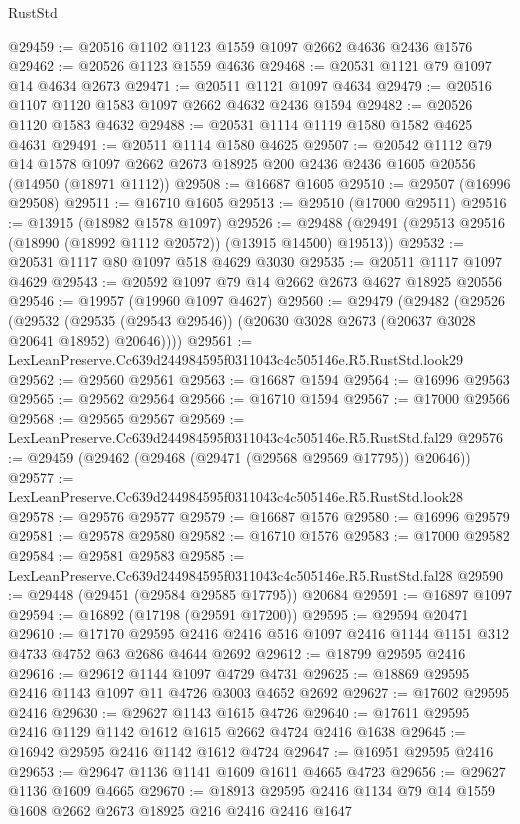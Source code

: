 \begin{lexlean}{RustStd}
\begin{coremodule}
@29459 := @20516 @1102 @1123 @1559 @1097 @2662 @4636 @2436 @1576
@29462 := @20526 @1123 @1559 @4636
@29468 := @20531 @1121 @79 @1097 @14 @4634 @2673
@29471 := @20511 @1121 @1097 @4634
@29479 := @20516 @1107 @1120 @1583 @1097 @2662 @4632 @2436 @1594
@29482 := @20526 @1120 @1583 @4632
@29488 := @20531 @1114 @1119 @1580 @1582 @4625 @4631
@29491 := @20511 @1114 @1580 @4625
@29507 := @20542
    @1112
    @79
    @14
    @1578
    @1097
    @2662
    @2673
    @18925
    @200
    @2436
    @2436
    @1605
    @20556
    (@14950 (@18971 @1112))
@29508 := @16687 @1605
@29510 := @29507 (@16996 @29508)
@29511 := @16710 @1605
@29513 := @29510 (@17000 @29511)
@29516 := @13915 (@18982 @1578 @1097)
@29526 := @29488 (@29491 (@29513 @29516 (@18990 (@18992 @1112 @20572)) (@13915 @14500) @19513))
@29532 := @20531 @1117 @80 @1097 @518 @4629 @3030
@29535 := @20511 @1117 @1097 @4629
@29543 := @20592 @1097 @79 @14 @2662 @2673 @4627 @18925 @20556
@29546 := @19957 (@19960 @1097 @4627)
@29560 := @29479
    (@29482
      (@29526
        (@29532 (@29535 (@29543 @29546)) (@20630 @3028 @2673 (@20637 @3028 @20641 @18952) @20646))))
@29561 := LexLeanPreserve.Cc639d244984595f0311043c4c505146e.R5.RustStd.look29
@29562 := @29560 @29561
@29563 := @16687 @1594
@29564 := @16996 @29563
@29565 := @29562 @29564
@29566 := @16710 @1594
@29567 := @17000 @29566
@29568 := @29565 @29567
@29569 := LexLeanPreserve.Cc639d244984595f0311043c4c505146e.R5.RustStd.fal29
@29576 := @29459 (@29462 (@29468 (@29471 (@29568 @29569 @17795)) @20646))
@29577 := LexLeanPreserve.Cc639d244984595f0311043c4c505146e.R5.RustStd.look28
@29578 := @29576 @29577
@29579 := @16687 @1576
@29580 := @16996 @29579
@29581 := @29578 @29580
@29582 := @16710 @1576
@29583 := @17000 @29582
@29584 := @29581 @29583
@29585 := LexLeanPreserve.Cc639d244984595f0311043c4c505146e.R5.RustStd.fal28
@29590 := @29448 (@29451 (@29584 @29585 @17795)) @20684
@29591 := @16897 @1097
@29594 := @16892 (@17198 (@29591 @17200))
@29595 := @29594 @20471
@29610 := @17170
    @29595
    @2416
    @2416
    @516
    @1097
    @2416
    @1144
    @1151
    @312
    @4733
    @4752
    @63
    @2686
    @4644
    @2692
@29612 := @18799 @29595 @2416
@29616 := @29612 @1144 @1097 @4729 @4731
@29625 := @18869 @29595 @2416 @1143 @1097 @11 @4726 @3003 @4652 @2692
@29627 := @17602 @29595 @2416
@29630 := @29627 @1143 @1615 @4726
@29640 := @17611 @29595 @2416 @1129 @1142 @1612 @1615 @2662 @4724 @2416 @1638
@29645 := @16942 @29595 @2416 @1142 @1612 @4724
@29647 := @16951 @29595 @2416
@29653 := @29647 @1136 @1141 @1609 @1611 @4665 @4723
@29656 := @29627 @1136 @1609 @4665
@29670 := @18913 @29595 @2416 @1134 @79 @14 @1559 @1608 @2662 @2673 @18925 @216 @2416 @2416 @1647

\end{coremodule}
\end{lexlean}

